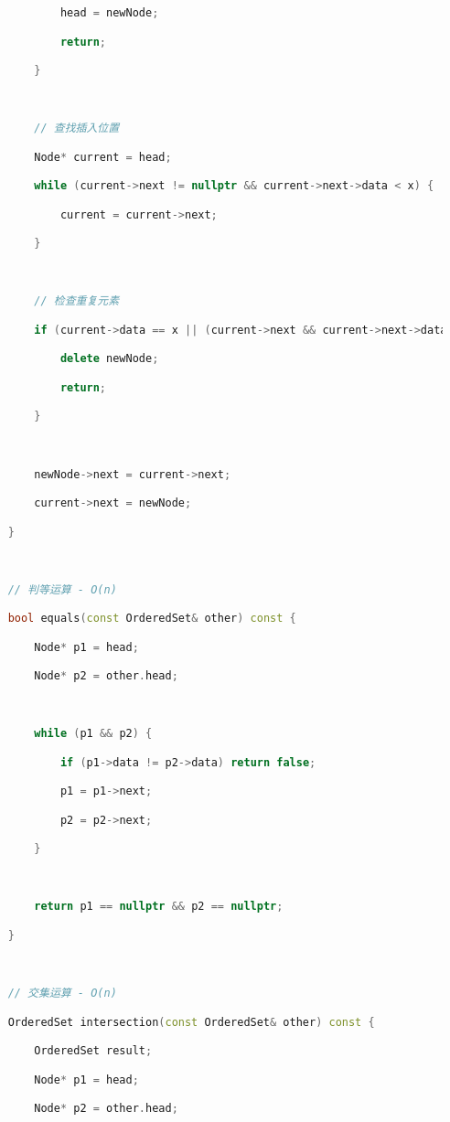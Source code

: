 \begin{lstlisting}[language=C++]
            head = newNode;

            return;

        }

  

        // 查找插入位置

        Node* current = head;

        while (current->next != nullptr && current->next->data < x) {

            current = current->next;

        }

  

        // 检查重复元素

        if (current->data == x || (current->next && current->next->data == x)) {

            delete newNode;

            return;

        }

  

        newNode->next = current->next;

        current->next = newNode;

    }

  

    // 判等运算 - O(n)

    bool equals(const OrderedSet& other) const {

        Node* p1 = head;

        Node* p2 = other.head;

  

        while (p1 && p2) {

            if (p1->data != p2->data) return false;

            p1 = p1->next;

            p2 = p2->next;

        }

  

        return p1 == nullptr && p2 == nullptr;

    }

  

    // 交集运算 - O(n)

    OrderedSet intersection(const OrderedSet& other) const {

        OrderedSet result;

        Node* p1 = head;

        Node* p2 = other.head;

  


\end{lstlisting}
